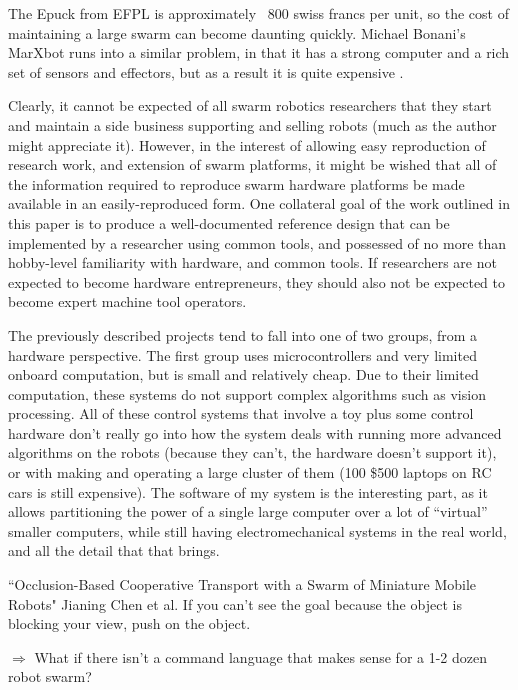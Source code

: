 \documentclass[]{article}
\begin{document}
The Epuck from EFPL is approximately ~800 swiss francs per unit, so the cost of maintaining a large swarm can become daunting quickly. Michael Bonani's MarXbot runs into a similar problem, in that it has a strong computer and a rich set of sensors and effectors, but as a result it is quite expensive \cite{bonani2010marxbot}.

Clearly, it cannot be expected of all swarm robotics researchers that they start and maintain a side business supporting and selling robots (much as the author might appreciate it).
However, in the interest of allowing easy reproduction of research work, and extension of swarm platforms, it might be wished that all of the information required to reproduce swarm hardware platforms be made available in an easily-reproduced form.
One collateral goal of the work outlined in this paper is to produce a well-documented reference design that can be implemented by a researcher using common tools, and possessed of no more than hobby-level familiarity with hardware, and common tools. 
If researchers are not expected to become hardware entrepreneurs, they should also not be expected to become expert machine tool operators. 

The previously described projects tend to fall into one of two groups, from a hardware perspective. The first group uses microcontrollers and very limited onboard computation, but is small and relatively cheap. Due to their limited computation, these systems do not support complex algorithms such as vision processing. 
All of these control systems that involve a toy plus some control hardware don't really go into how the system deals with running more advanced algorithms on the robots (because they can't, the hardware doesn't support it), or with making and operating a large cluster of them (100 \$500 laptops on RC cars is still expensive). The software of my system is the interesting part, as it allows partitioning the power of a single large computer over a lot of ``virtual'' smaller computers, while still having electromechanical systems in the real world, and all the detail that that brings.


``Occlusion-Based Cooperative Transport with a Swarm of Miniature Mobile Robots" Jianing Chen et al. If you can't see the goal because the object is blocking your view, push on the object. 

$\Rightarrow$ What if there isn't a command language that makes sense for a 1-2 dozen robot swarm?
\end{document}
